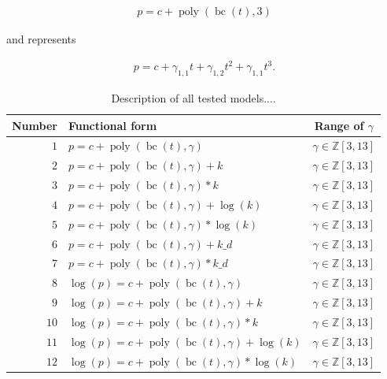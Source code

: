 \documentclass[12pt,a4paper]{article}
\DeclareMathOperator{\bc}{bc}
\DeclareMathOperator{\poly}{poly}
\begin{document}
\begin{align}
    p = c + \poly\left( \bc(t), 3 \right)
\end{align}

and represents

\begin{align}
    p = c + \gamma_{1,1} t + \gamma_{1,2} t^2 + \gamma_{1,1} t^3 .
\end{align}

\begin{table}
    \centering
    \caption{Description of all tested models....}
    \label{tab:func_form}    
    \begin{tabular}{rlc}
        Number & Functional form & Range of $\gamma$ \\
        \toprule
        $1$ & $p = c + \poly\left( \bc(t), \gamma \right) $ & $\gamma \in \mathbb{Z} \left[3, 13 \right]$\\ 
        $2$ & $p = c + \poly\left( \bc(t), \gamma \right) + k $ & $\gamma \in \mathbb{Z} \left[3, 13 \right]$\\
        $3$ & $p = c + \poly\left( \bc(t), \gamma \right) * k $ & $\gamma \in \mathbb{Z} \left[3, 13 \right]$\\
        $4$ & $p = c + \poly\left( \bc(t), \gamma \right) + \log(k) $ & $\gamma \in \mathbb{Z} \left[3, 13 \right]$\\
        $5$ & $p = c + \poly\left( \bc(t), \gamma \right) * \log(k) $ & $\gamma \in \mathbb{Z} \left[3, 13 \right]$\\
        $6$ & $p = c + \poly\left( \bc(t), \gamma \right) + k\_d $ & $\gamma \in \mathbb{Z} \left[3, 13 \right]$\\
        $7$ & $p = c + \poly\left( \bc(t), \gamma \right) * k\_d $ & $\gamma \in \mathbb{Z} \left[3, 13 \right]$\\ %
        \midrule
        $8$ & $\log(p) = c + \poly\left( \bc(t), \gamma \right) $ & $\gamma \in \mathbb{Z} \left[3, 13 \right]$\\ 
        $9$ & $\log(p) = c + \poly\left( \bc(t), \gamma \right) + k $ & $\gamma \in \mathbb{Z} \left[3, 13 \right]$\\
        $10$ & $\log(p) = c + \poly\left( \bc(t), \gamma \right) * k $ & $\gamma \in \mathbb{Z} \left[3, 13 \right]$\\
        $11$ & $\log(p) = c + \poly\left( \bc(t), \gamma \right) + \log(k) $ & $\gamma \in \mathbb{Z} \left[3, 13 \right]$\\
        $12$ & $\log(p) = c + \poly\left( \bc(t), \gamma \right) * \log(k) $ & $\gamma \in \mathbb{Z} \left[3, 13 \right]$\\

\end{tabular}
\end{table}
\end{document}

